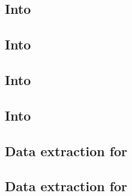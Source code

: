 \subsection{Into \wcpMod{}                        \lispTodo{}}        \label{rlp auth: lookup: into wcp}                   
\subsection{Into \userTxnDataMod{}                \lispTodo{}}        \label{rlp auth: lookup: into txn data}              
\subsection{Into \btcMod{}                        \lispTodo{}}        \label{rlp auth: lookup: into block data}            
\subsection{Into \hubMod{}                        \lispTodo{}}        \label{rlp auth: lookup: into hub}                   
\subsection{Data extraction for      \lispTodo{}}        \label{rlp auth: lookup: extraction for code hash}   
\subsection{Data extraction for \macroEcrecover{} \lispTodo{}}        \label{rlp auth: lookup: extraction for ecrecover}   
